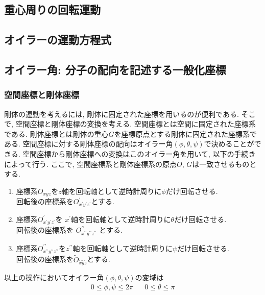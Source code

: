 \subsection{重心周りの回転運動}

\subsection{オイラーの運動方程式}

\subsection{オイラー角: 分子の配向を記述する一般化座標}
\subsubsection{空間座標と剛体座標}
剛体の運動を考えるには, 剛体に固定された座標を用いるのが便利である. 
そこで, 空間座標と剛体座標の変換を考える. 
空間座標とは空間に固定された座標系である. 
剛体座標とは剛体の重心$G$を座標原点とする剛体に固定された座標系である. 
空間座標に対する剛体座標の配向はオイラー角$(\phi,\theta,\psi)$で決めることができる. 
空間座標から剛体座標への変換はこのオイラー角を用いて, 以下の手続きによって行う. 
ここで, 空間座標系と剛体座標系の原点$O$, $G$は一致させるものとする. 
\begin{enumerate}
 \item 座標系$O_{xyz}$を$z$軸を回転軸として逆時計周りに$\phi$だけ回転させる. 
       \\回転後の座標系を$O^{\prime}_{x^{\prime}y^{\prime}z^{\prime}}$とする. 
 \item 座標系$O^{\prime}_{x^{\prime}y^{\prime}z^{\prime}}$を
       $x^{\prime}$軸を回転軸として逆時計周りに$\theta$だけ回転させる. 
       \\回転後の座標系を
       $O^{\prime \prime}_{x^{\prime \prime} y^{\prime \prime} z^{\prime \prime}}$
       とする.

 \item 座標系$O^{\prime \prime}_{x^{\prime \prime} y^{\prime \prime} z^{\prime \prime}}$を$z^{\prime \prime}$軸を回転軸として逆時計周りに$\psi$だけ回転させる. 
       \\回転後の座標系を$\tilde{O}_{\tilde{x} \tilde{y} \tilde{z}}$とする. 
\end{enumerate}
以上の操作においてオイラー角$(\phi,\theta,\psi)$の変域は
\begin{align}
 0 \leq \phi,\psi \leq 2\pi && 0 \leq \theta \leq \pi
 \label{eq:RigidBodyMD1}
\end{align}

